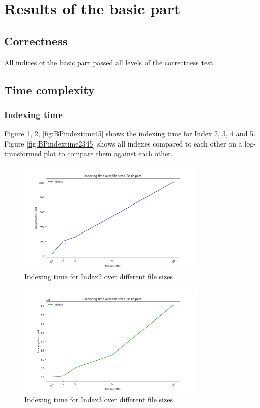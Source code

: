 \section{Results of the basic part}
\subsection{Correctness}
All indices of the basic part passed all levels of the correctness test.

\subsection{Time complexity}
\subsubsection{Indexing time}
Figure \ref{fig:BPindextime2}, \ref{fig:BPindextime3}, \ref{fig:BPindextime45} shows the indexing time for Index 2, 3, 4 and 5. Figure \ref{fig:BPindextime2345} shows all indexes compared to each other on a log-transformed plot to compare them against each other.


\begin{figure}[H]
    \centering
     \includegraphics[width=0.8\textwidth]{LaTeX/Pictures/Results/BPIndexing[2].png}
    \caption{Indexing time for Index2 over different file sizes}
    \label{fig:BPindextime2}
\end{figure}

\begin{figure}[H]
    \centering
    \includegraphics[width=0.8\textwidth]{LaTeX/Pictures/Results/BPIndexing[3].png}
    \caption{Indexing time for Index3 over different file sizes}
    \label{fig:BPindextime3}
\end{figure}

